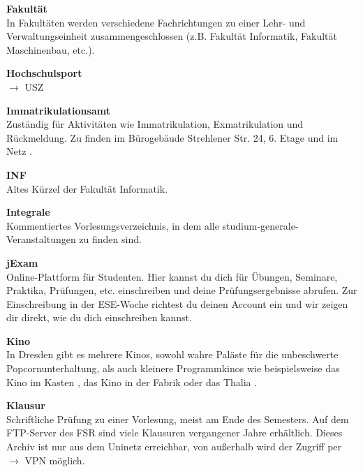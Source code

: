 \begin{multicols}{2}
\textbf{Fakultät} \\
In Fakultäten werden verschiedene Fachrichtungen zu einer Lehr- und Verwaltungseinheit zusammengeschlossen (z.B. Fakultät Informatik, Fakultät Maschinenbau, etc.).


\textbf{Hochschulsport} \\
$\rightarrow$ USZ

\textbf{Immatrikulationsamt} \\
Zuständig für Aktivitäten wie Immatrikulation, Exmatrikulation und Rückmeldung.
Zu finden im Bürogebäude Strehlener Str. 24, 6. Etage und im Netz .

\textbf{INF} \\
Altes Kürzel der Fakultät Informatik.

\textbf{Integrale} \\
Kommentiertes Vorlesungsverzeichnis, in dem alle studium-generale-Veranstaltungen zu finden sind. 

\vfill\columnbreak

\textbf{jExam} \\
Online-Plattform für Studenten.
Hier kannst du dich für Übungen, Seminare, Praktika, Prüfungen, etc. einschreiben und deine Prüfungsergebnisse abrufen.
Zur Einschreibung in der ESE-Woche richtest du deinen Account ein und wir zeigen dir direkt, wie du dich einschreiben kannst. 

\textbf{Kino} \\
In Dresden gibt es mehrere Kinos, sowohl wahre Paläste für die unbeschwerte Popcornunterhaltung, als auch kleinere Programmkinos wie beispielsweise das Kino im Kasten , das Kino in der Fabrik  oder das Thalia .

\textbf{Klausur} \\
Schriftliche Prüfung zu einer Vorlesung, meist am Ende des Semesters.
Auf dem FTP-Server des FSR  sind viele Klausuren vergangener Jahre erhältlich. Dieses Archiv ist nur aus dem Uninetz erreichbar, von außerhalb wird der Zugriff per $\rightarrow$ VPN möglich.


\end{multicols}
